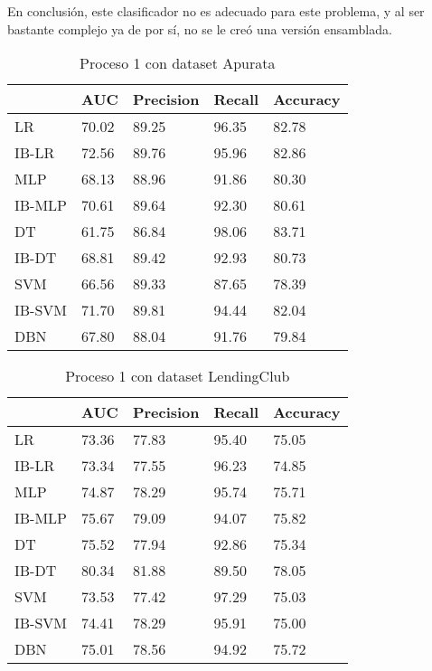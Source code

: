En conclusión, este clasificador no es adecuado para este problema, y al ser bastante complejo ya de por sí, no se le creó una versión ensamblada.


\begin{table}[]
\centering
\caption{Proceso 1 con dataset Apurata}
\label{tab:apurata-proc1}
\begin{tabularx}{0.75\textwidth}{|l|Y Y Y Y|}
                \hline
                & AUC       & Precision & Recall    & Accuracy  \\
                \hline
LR              & 70.02     & 89.25     & 96.35     & 82.78     \\
IB-LR           & 72.56     & 89.76     & 95.96     & 82.86     \\
                \hline
MLP             & 68.13     & 88.96     & 91.86     & 80.30     \\
IB-MLP          & 70.61     & 89.64     & 92.30     & 80.61     \\
                \hline
DT              & 61.75     & 86.84     & 98.06     & 83.71     \\
IB-DT           & 68.81     & 89.42     & 92.93     & 80.73     \\
                \hline
SVM             & 66.56     & 89.33     & 87.65     & 78.39     \\
IB-SVM          & 71.70     & 89.81     & 94.44     & 82.04     \\
                \hline
DBN             & 67.80     & 88.04     & 91.76     & 79.84     \\
                \hline
\end{tabularx}
\end{table}


\begin{table}[]
\centering
\caption{Proceso 1 con dataset LendingClub}
\label{tab:lc-proc1}
\begin{tabularx}{0.75\textwidth}{|l|Y Y Y Y|}
                \hline
                & AUC       & Precision & Recall    & Accuracy  \\
                \hline
LR              & 73.36     & 77.83     & 95.40     & 75.05		\\
IB-LR           & 73.34     & 77.55     & 96.23     & 74.85		\\
                \hline
MLP             & 74.87     & 78.29     & 95.74     & 75.71		\\
IB-MLP          & 75.67     & 79.09     & 94.07     & 75.82		\\
                \hline
DT              & 75.52     & 77.94     & 92.86     & 75.34		\\
IB-DT           & 80.34     & 81.88     & 89.50     & 78.05		\\
                \hline
SVM             & 73.53     & 77.42     & 97.29     & 75.03		\\
IB-SVM          & 74.41     & 78.29     & 95.91     & 75.00		\\
                \hline
DBN             & 75.01     & 78.56     & 94.92     & 75.72		\\
                \hline
\end{tabularx}
\end{table}


